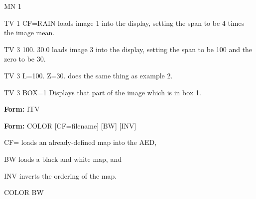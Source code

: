 {\newpage\clearpage
{}%
\begin{example}
  \item[{MN 1\hfill}]{}
  \item[{TV 1 CF=RAIN\hfill}]{loads image 1 into the display, setting the
       span to be 4 times the image mean.}
\end{example}%
\lthtmlfigureZ
\lthtmlcheckvsize\clearpage}

{\newpage\clearpage
{}%
\begin{example}
  \item[{TV 3 100. 30.0\hfill}]{loads image 3 into the display, setting the
       span to be 100 and the zero to be 30.}
\end{example}%
\lthtmlfigureZ
\lthtmlcheckvsize\clearpage}

{\newpage\clearpage
{}%
\begin{example}
  \item[{TV 3 L=100. Z=30.\hfill}]{does the same thing as example 2.}
\end{example}%
\lthtmlfigureZ
\lthtmlcheckvsize\clearpage}

{\newpage\clearpage
{}%
\begin{example}
  \item[{TV 3 BOX=1\hfill}]{Displays that part of the image
       which is in box 1.}
\end{example}%
\lthtmlfigureZ
\lthtmlcheckvsize\clearpage}

{\newpage\clearpage
{}%
\begin{command}
  \item[\textbf{Form: }ITV\hfill]{}
\end{command}%
\lthtmlfigureZ
\lthtmlcheckvsize\clearpage}

{\newpage\clearpage
{}%
\begin{command}
  \item[\textbf{Form: }COLOR {[CF=filename]} {[BW]} {[INV]}\hfill]{}
  \item[CF=]{loads an already-defined map into the AED,}
  \item[BW]{loads a black and white map, and}
  \item[INV]{inverts the ordering of the map.}
\end{command}%
\lthtmlfigureZ
\lthtmlcheckvsize\clearpage}

{\newpage\clearpage
{}%
\begin{hanging}
  \item{COLOR BW}
\end{hanging}%
\lthtmlfigureZ
\lthtmlcheckvsize\clearpage}

